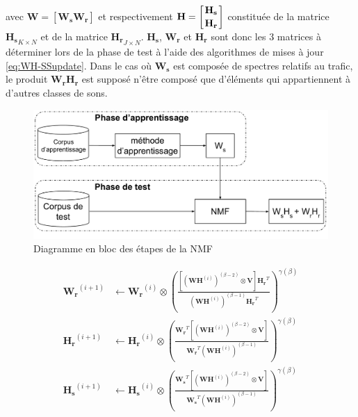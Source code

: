 avec $\mathbf{W} = \left[ \mathbf{W_s} \mathbf{W_r} \right]$ et respectivement $\mathbf{H} = \left[ \genfrac{}{}{0pt}{0}{\mathbf{H_s}}{\mathbf{H_r}} \right]$ constituée de la matrice $\mathbf{H_s}_{K \times N}$ et de la matrice $\mathbf{H_r}_{J \times N}$. $\mathbf{H_s}$, $\mathbf{W_r}$ et $\mathbf{H_r}$ sont donc les 3 matrices à déterminer lors de la phase de test à l'aide des algorithmes de mises à jour \ref{eq:WH-SSupdate}. Dans le cas où $\mathbf{W_s}$ est composée de spectres relatifs au trafic, le produit $\mathbf{W_r} \mathbf{H_r}$ est supposé n'être composé que d'éléments qui appartiennent à d'autres classes de sons.

\begin{figure}[t]
\centering
\includegraphics[width=.85\linewidth]{./figures/NMF/NMF_semi-supervised.pdf}
\caption{Diagramme en bloc des étapes de la NMF}
\label{fig:semi-supervised_learning}
\end{figure}

\begin{subequations}\label{eq:WH-SSupdate}
\begin{align}
\mathbf{W_r}^{(i+1)} &\leftarrow \mathbf{W_r}^{(i)}\otimes\left(\frac{\left[\left(\mathbf{WH}^{(i)} \right)^{(\beta-2)}\otimes\mathbf{V} \right]\mathbf{H_r}^T}{\left(\mathbf{WH}^{(i)} \right)^{(\beta-1)}\mathbf{H_r}^T}\right)^{\gamma(\beta)}\label{eq:W_r_SS}\\
\mathbf{H_r}^{(i+1)} &\leftarrow \mathbf{H_r}^{(i)}\otimes\left(\frac{\mathbf{W_r}^T \left[\left(\mathbf{WH}^{(i)} \right)^{(\beta-2)}\otimes\mathbf{V} \right]}{\mathbf{W_r}^T \left(\mathbf{WH}^{(i)} \right)^{(\beta-1)}}\right)^{\gamma(\beta)}\label{eq:H_r_SS}\\
\mathbf{H_s}^{(i+1)} &\leftarrow \mathbf{H_s}^{(i)}\otimes\left(\frac{\mathbf{W_s}^T \left[\left(\mathbf{WH}^{(i)} \right)^{(\beta-2)}\otimes\mathbf{V} \right]}{\mathbf{W_s}^T \left(\mathbf{WH}^{(i)} \right)^{(\beta-1)}}\right)^{\gamma(\beta)}\label{eq:H_s_SS}
\end{align}
\end{subequations}

